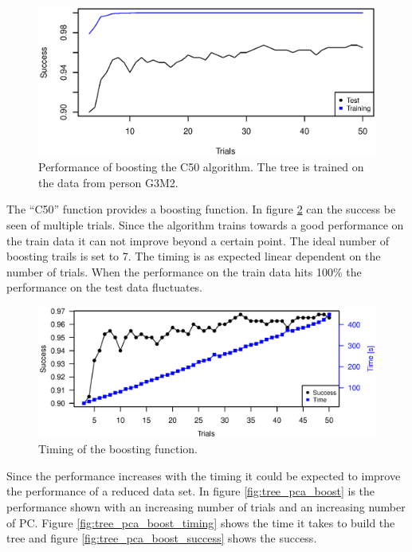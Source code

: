 \begin{figure}[H]
\includegraphics[width = \textwidth]{graphics/tree_boost_overfitting}
\caption[Success for decision tree with boosting.]{Performance of boosting the C50 algorithm. 
The tree is trained on the data from person G3M2. }
\label{fig:tree_overfitting}
\end{figure}

The ``C50'' function provides a boosting function.
In figure \ref{fig:tree_timing} can the success be seen of multiple trials.
Since the algorithm trains towards a good performance on the train data it can not improve beyond a certain point.
The ideal number of boosting trails is set to 7.
The timing is as expected linear dependent on the number of trials.
When the performance on the train data hits 100\% the performance on the test data fluctuates. 

\begin{figure}[H]
\includegraphics[width = \textwidth]{graphics/tree_timing_one}
\caption[Timing for decision tree with boosting.]{Timing of the boosting function.}
\label{fig:tree_timing}
\end{figure}

Since the performance increases with the timing it could be expected to improve the performance of a reduced data set.
In figure \ref{fig:tree_pca_boost} is the performance shown with an increasing number of trials and an increasing number of PC.
Figure \ref{fig:tree_pca_boost_timing} shows the time it takes to build the tree and figure \ref{fig:tree_pca_boost_success} shows the success.

